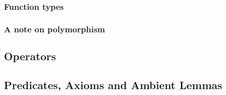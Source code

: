 
\subsubsection*{Function types}

\subsubsection*{A note on polymorphism}


\subsection{Operators}

\subsection{Predicates, Axioms and Ambient Lemmas\label{sec:ec-specifics}}

